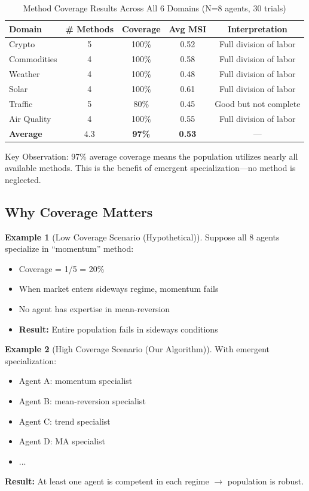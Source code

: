\documentclass[11pt,a4paper]{article}
\theoremstyle{definition}
\newtheorem{example}{Example}[section]
\theoremstyle{plain}
\begin{document}
\begin{table}[h]
\centering
\caption{Method Coverage Results Across All 6 Domains (N=8 agents, 30 trials)}
\begin{tabular}{l|c|c|c|c}
\toprule
Domain & \# Methods & Coverage & Avg MSI & Interpretation \\
\midrule
Crypto & 5 & 100\% & 0.52 & Full division of labor \\
Commodities & 4 & 100\% & 0.58 & Full division of labor \\
Weather & 4 & 100\% & 0.48 & Full division of labor \\
Solar & 4 & 100\% & 0.61 & Full division of labor \\
Traffic & 5 & 80\% & 0.45 & Good but not complete \\
Air Quality & 4 & 100\% & 0.55 & Full division of labor \\
\midrule
\textbf{Average} & 4.3 & \textbf{97\%} & \textbf{0.53} & --- \\
\bottomrule
\end{tabular}
\end{table}

\begin{keypoint}
Key Observation: 97\% average coverage means the population utilizes nearly all available methods. This is the benefit of emergent specialization---no method is neglected.
\end{keypoint}

\subsection{Why Coverage Matters}

\begin{example}[Low Coverage Scenario (Hypothetical)]
Suppose all 8 agents specialize in ``momentum'' method:
\begin{itemize}
    \item Coverage = 1/5 = 20\%
    \item When market enters sideways regime, momentum fails
    \item No agent has expertise in mean-reversion
    \item \textbf{Result:} Entire population fails in sideways conditions
\end{itemize}
\end{example}

\begin{example}[High Coverage Scenario (Our Algorithm)]
With emergent specialization:
\begin{itemize}
    \item Agent A: momentum specialist
    \item Agent B: mean-reversion specialist
    \item Agent C: trend specialist
    \item Agent D: MA specialist
    \item ...
\end{itemize}
\textbf{Result:} At least one agent is competent in each regime $\rightarrow$ population is robust.
\end{example}
\end{document}
